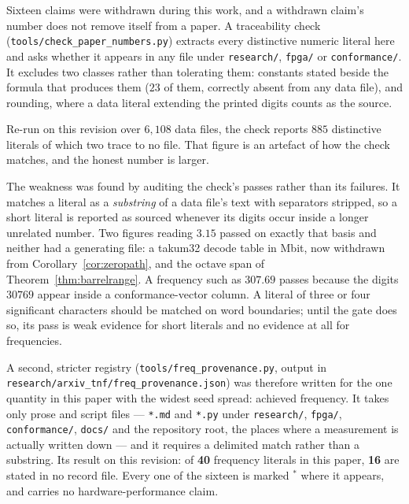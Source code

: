 Sixteen claims were withdrawn during this work, and a withdrawn claim's number
does not remove itself from a paper. A traceability check
(\texttt{tools/\allowbreak check\_\allowbreak paper\_\allowbreak numbers.py}) extracts every distinctive numeric
literal here and asks whether it appears in any file under \texttt{research/},
\texttt{fpga/} or \texttt{conformance/}. It excludes two classes rather than
tolerating them: constants stated beside the formula that produces them ($23$ of
them, correctly absent from any data file), and rounding, where a data literal
extending the printed digits counts as the source.

Re-run on this revision over $6{,}108$ data files, the check reports $885$
distinctive literals of which two trace to no file. That figure is an artefact of
how the check matches, and the honest number is larger.

The weakness was found by auditing the check's passes rather than its failures. It
matches a literal as a \emph{substring} of a data file's text with separators
stripped, so a short literal is reported as sourced whenever its digits occur
inside a longer unrelated number. Two figures reading $3.15$ passed on exactly that
basis and neither had a generating file: a takum32 decode table in Mbit, now
withdrawn from Corollary~\ref{cor:zeropath}, and the octave span of
Theorem~\ref{thm:barrelrange}. A frequency such as $307.69$ passes because the
digits $30769$ appear inside a conformance-vector column. A literal of three or
four significant characters should be matched on word boundaries; until the gate
does so, its pass is weak evidence for short literals and no evidence at all for
frequencies.

A second, stricter registry (\texttt{tools/}\allowbreak\texttt{freq\_provenance.py},
output in \texttt{research/}\allowbreak\texttt{arxiv\_tnf/}\allowbreak\texttt{freq\_provenance.json}) was therefore written for the
one quantity in this paper with the widest seed spread: achieved frequency. It
takes only prose and script files --- \texttt{*.md} and \texttt{*.py} under
\texttt{research/}, \texttt{fpga/}, \texttt{conformance/}, \texttt{docs/} and the
repository root, the places where a measurement is actually written down --- and it
requires a delimited match rather than a substring. Its result on this revision:
of \textbf{40} frequency literals in this paper, \textbf{16} are stated in no
record file. Every one of the sixteen is marked $^{\ast}$ where it appears, and
carries no hardware-performance claim.

